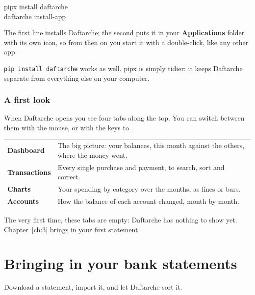 \documentclass[11pt]{article}
\begin{document}
\begin{tcolorbox}[enhanced, colback=night, colframe=night, arc=8pt, left=12pt, top=6pt, bottom=6pt,
  fontupper=\ttfamily\color{white}]
pipx install daftarche\\
daftarche install-app
\end{tcolorbox}

The first line installs Daftarche; the second puts it in your \textbf{Applications} folder with its
own icon, so from then on you start it with a double-click, like any other app.

\begin{careful}
\texttt{pip install daftarche} works as well. pipx is simply tidier: it keeps Daftarche separate from
everything else on your computer.
\end{careful}

\subsection{A first look}
When Daftarche opens you see four tabs along the top. You can switch between them with the
mouse, or with the keys  to .

\begin{inshort}
\begin{tabular}{@{}p{3.1cm}p{11.2cm}@{}}
\textbf{Dashboard}    & The big picture: your balances, this month against the others, where the money went.\\[0.3em]
\textbf{Transactions} & Every single purchase and payment, to search, sort and correct.\\[0.3em]
\textbf{Charts}       & Your spending by category over the months, as lines or bars.\\[0.3em]
\textbf{Accounts}     & How the balance of each account changed, month by month.
\end{tabular}
\end{inshort}

The very first time, these tabs are empty: Daftarche has nothing to show yet. Chapter~\ref{ch:3}
brings in your first statement.

\chapter{Bringing in your bank statements}{Download a statement, import it, and let Daftarche sort it.}\label{ch:3}
\end{document}
